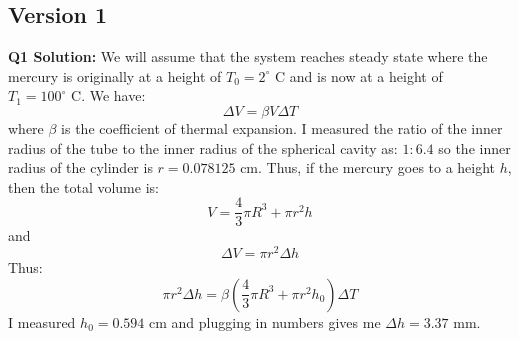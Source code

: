 \documentclass{article}
\begin{document}
\subsection*{Version 1}
\textbf{Q1 Solution:} We will assume that the system reaches steady state where the mercury is originally at a height of $T_0=2^\circ \text{ C}$ and is now at a height of $T_1=100^\circ \text{ C}$. We have:
\begin{equation}
    \Delta V = \beta V \Delta T
    \label{eq:}
\end{equation}
where $\beta$ is the coefficient of thermal expansion. I measured the ratio of the inner radius of the tube to the inner radius of the spherical cavity as: $1:6.4$ so the inner radius of the cylinder is $r=0.078125 \text{ cm}$. Thus, if the mercury goes to a height $h$, then the total volume is:
\begin{equation}
    V=\frac{4}{3}\pi R^3 + \pi r^2 h
    \label{eq:}
\end{equation}
and
\begin{equation}
    \Delta V=\pi r^2 \Delta h
    \label{eq:}
\end{equation}
Thus:
\begin{equation}
    \pi r^2 \Delta h=\beta\left(\frac{4}{3}\pi R^3 + \pi r^2 h_0\right)\Delta T
    \label{eq:}
\end{equation}
I measured $h_0=0.594 \text{ cm}$ and plugging in numbers gives me $\Delta h=3.37 \text{ mm}$.
\end{document}
